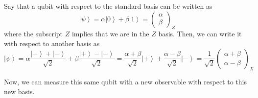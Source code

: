 \documentclass{article}
\newcommand{\ket}[1]{\ensuremath{\left|#1\right\rangle}}
\newcounter{example}[section]
\begin{document}
    \begin{example}
      \label{ex:a-qubit-in-the-standard-basis}
 
      Say that a qubit with respect to the standard basis can be written as 
      \begin{equation}
        \ket{\psi} = \alpha \ket{0} + \beta \ket{1} = \begin{pmatrix} \alpha \\ \beta \end{pmatrix}_Z 
      \end{equation}
      where the subscript $Z$ implies that we are in the $Z$ basis. Then, we can write it with respect to another basis as 
      \begin{equation}
        \ket{\psi} = \alpha \frac{\ket{+} + \ket{-}}{\sqrt{2}} + \beta \frac{\ket{+} - \ket{-}}{\sqrt{2}} = \frac{\alpha + \beta}{\sqrt{2}} \ket{+} + \frac{\alpha - \beta}{\sqrt{2}} \ket{-} = \frac{1}{\sqrt{2}} \begin{pmatrix} \alpha + \beta \\ \alpha - \beta \end{pmatrix}_X
      \end{equation}
    \end{example}

    Now, we can measure this same qubit with a new observable with respect to this new basis. 
\end{document}
